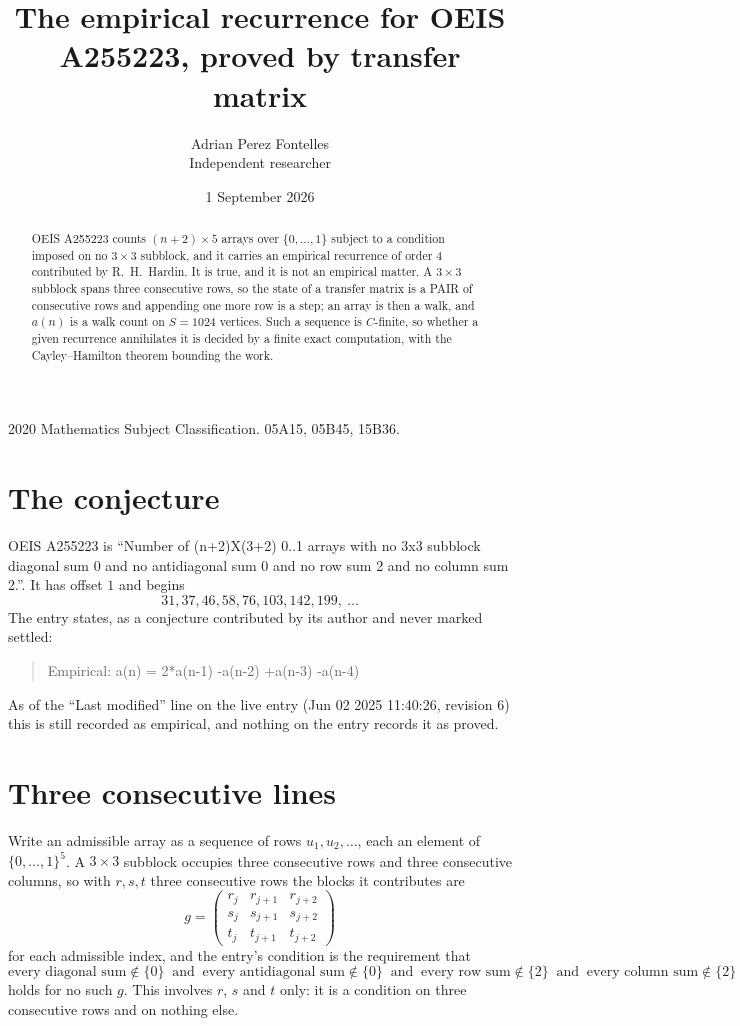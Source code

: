 \documentclass[11pt,a4paper]{article}
\title{The empirical recurrence for OEIS A255223, proved by transfer matrix}
\author{Adrian Perez Fontelles\\ \small Independent researcher}
\date{1 September 2026}
\theoremstyle{plain}
\theoremstyle{definition}
\begin{document}
\maketitle

\begin{abstract}
OEIS A255223 counts $(n+2)\times5$ arrays over $\{0,\dots,1\}$ subject to a condition imposed on
no $3\times3$ subblock, and it carries an empirical recurrence of order $4$
contributed by R.~H.~Hardin. It is true, and it is not an empirical matter. A $3\times3$
subblock spans three consecutive rows, so the state of a transfer matrix is a PAIR of
consecutive rows and appending one more row is a step; an array is then a walk, and
$a(n)$ is a walk count on $S=1024$ vertices. Such a sequence is $C$-finite, so whether a given
recurrence annihilates it is decided by a finite exact computation, with the Cayley--Hamilton
theorem bounding the work.
\end{abstract}

\noindent\small 2020 Mathematics Subject Classification. 05A15, 05B45, 15B36.\normalsize

\section{The conjecture}

OEIS A255223 is ``Number of (n+2)X(3+2) 0..1 arrays with no 3x3 subblock diagonal sum 0 and no antidiagonal sum 0 and no row sum 2 and no column sum 2.''. It has offset $1$ and begins
\[
31, 37, 46, 58, 76, 103, 142, 199,\ \dots
\]
The entry states, as a conjecture contributed by its author and never marked settled:
\begin{quote}
Empirical: a(n) = 2*a(n-1) -a(n-2) +a(n-3) -a(n-4)
\end{quote}
As of the ``Last modified'' line on the live entry (Jun 02 2025 11:40:26, revision 6) this is still
recorded as empirical, and nothing on the entry records it as proved.

\section{Three consecutive lines}

Write an admissible array as a sequence of rows $u_1,u_2,\dots$, each an element of
$\{0,\dots,1\}^{5}$. A $3\times3$ subblock occupies three consecutive rows and
three consecutive columns, so with $r,s,t$ three consecutive rows the blocks it
contributes are
\[
g=\begin{pmatrix}r_j&r_{j+1}&r_{j+2}\\ s_j&s_{j+1}&s_{j+2}\\ t_j&t_{j+1}&t_{j+2}\end{pmatrix}
\]
for each admissible index, and the entry's condition is the requirement that
\[
\text{every diagonal sum} \notin \{0\}\ \text{ and }\ \text{every antidiagonal sum} \notin \{0\}\ \text{ and }\ \text{every row sum} \notin \{2\}\ \text{ and }\ \text{every column sum} \notin \{2\}
\]
holds for no such $g$. This involves $r$, $s$ and $t$ only: it is a condition on
three consecutive rows and on nothing else.
\end{document}
